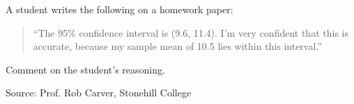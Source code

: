 
A student writes the following on a homework paper: 
\begin{quotation}
``The 95\% confidence interval is (9.6, 11.4). I'm very confident that this is accurate, because my sample mean of 10.5 lies within this interval.''
\end{quotation}
Comment on the student's reasoning.

\TextEntry

{\small Source: Prof. Rob Carver, Stonehill College}